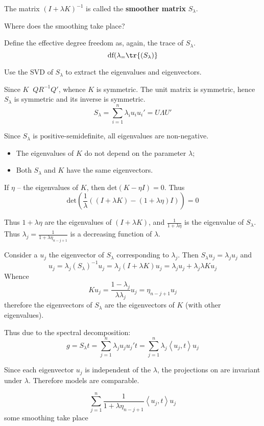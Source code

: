 \documentclass[a4paper]{article}
\newcommand{\brac}[1]{{\left ( #1 \right )}}
\newcommand{\brkt}[1]{{\left\langle #1 \right\rangle}}
\newcommand{\defn}{\mathop{\overset{\Delta}{=}}\nolimits}
\begin{document}
The matrix $\brac{I + \lambda K}^{-1}$ is called the \textbf{smoother matrix} $S_\lambda$.

Where does the smoothing take place? 

Define the effective degree freedom as, again, the trace of $S_\lambda$.
\[\text{df}(\lambda_ = \tr\brac{S_\lambda}\]

Use the SVD of $S_\lambda$ to extract the eigenvalues and eigenvectors.

Since $K \defn Q R^{-1} Q'$, whence $K$ is symmetric. The unit matrix is symmetric, hence $S_\lambda$ is symmetric and its inverse is symmetric.
\[S_\lambda = \sum_{i=1}^n \lambda_i u_i u_i' = U\Lambda U'\]

Since  $S_\lambda$ is positive-semidefinite, all eigenvalues are non-negative.

\begin{itemize}
	\item The eigenvalues of $K$ do not depend on the parameter $\lambda$;
	\item Both $S_\lambda$ and $K$ have the same eigenvectors.
\end{itemize}

If $\eta$ -- the eigenvalues of $K$, then $\text{det}\brac{K-\eta I} = 0$.
Thus \[\text{det}\brac{\frac{1}{\lambda}\brac{\brac{I+\lambda K} -(1 + \lambda \eta) I} } = 0\]

Thus $1 + \lambda \eta$ are the eigenvalues of $\brac{I+\lambda K}$, and $\frac{1}{1 + \lambda \eta}$ is the eigenvalue of $S_\lambda$.
Thus $\lambda_j = \frac{1}{1+\lambda \eta_{n-j+1}}$ is a decreasing function of $\lambda$.

Consider a $u_j$ the eigenvector of $S_\lambda$ corresponding to $\lambda_j$.
Then $S_\lambda u_j = \lambda_j u_j$ and
\[u_j = \lambda_j \brac{S_\lambda}^{-1} u_j
= \lambda_j \brac{I+\lambda K} u_j
= \lambda_j u_j + \lambda_j \lambda K u_j\]
Whence
\[K u_j = \frac{1-\lambda_j}{\lambda \lambda_j} u_j = \eta_{n-j+1} u_j\]
therefore the eigenvectors of $S_\lambda$ are the eigenvectors of $K$ (with other eigenvalues).


Thus due to the spectral decomposition:
\[g = S_\lambda t = \sum_{j=1}^n \lambda_j u_j u_j' t = \sum_{j=1}^n \lambda_j \brkt{u_j, t} u_j \]

Since each eigenvector $u_j$ is independent of the $\lambda$, the projections on are invariant under $\lambda$. Therefore models are comparable.

\[\sum_{j=1}^n \frac{1}{1+\lambda\eta_{n-j+1}} \brkt{u_j, t} u_j\]
some smoothing take place
\end{document}
